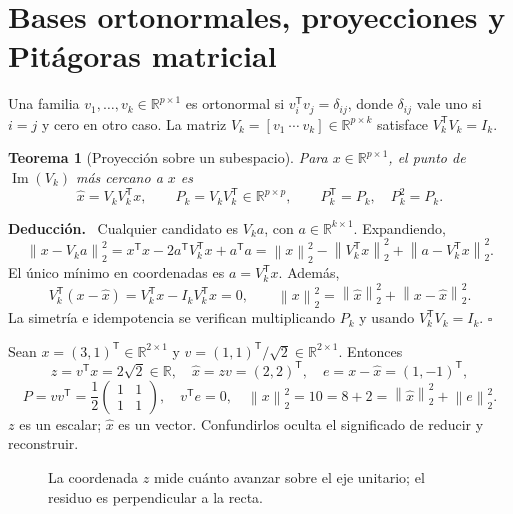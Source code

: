 \documentclass[11pt,a4paper]{article}
\newcommand{\R}{\mathbb R}
\newcommand{\T}{^{\mathsf T}}
\newcommand{\norm}[1]{\left\lVert #1\right\rVert}
\DeclareMathOperator{\spanop}{span}
\newenvironment{deduccion}{\par\textbf{Deducción.}\ }{\hfill$\square$\par}
\DeclareMathOperator{\range}{Im}
\newtheorem{teorema}{Teorema}[section]
\theoremstyle{definition}
\begin{document}
\section{Bases ortonormales, proyecciones y Pitágoras matricial}
Una familia $v_1,\ldots,v_k\in\R^{p\times1}$ es ortonormal si $v_i\T v_j=\delta_{ij}$, donde $\delta_{ij}$ vale uno si $i=j$ y cero en otro caso. La matriz $V_k=[v_1\ \cdots\ v_k]\in\R^{p\times k}$ satisface $V_k\T V_k=I_k$.
\begin{teorema}[Proyección sobre un subespacio]
Para $x\in\R^{p\times1}$, el punto de $\range(V_k)$ más cercano a $x$ es
\[
\widehat x=V_kV_k\T x,\qquad P_k=V_kV_k\T\in\R^{p\times p},\qquad
P_k\T=P_k,\quad P_k^2=P_k.
\]
\end{teorema}
\begin{deduccion}
Cualquier candidato es $V_k a$, con $a\in\R^{k\times1}$. Expandiendo,
\[
\norm{x-V_ka}_2^2=x\T x-2a\T V_k\T x+a\T a
=\norm{x}_2^2-\norm{V_k\T x}_2^2+\norm{a-V_k\T x}_2^2.
\]
El único mínimo en coordenadas es $a=V_k\T x$. Además,
\[
V_k\T(x-\widehat x)=V_k\T x-I_kV_k\T x=0,\qquad
\norm x_2^2=\norm{\widehat x}_2^2+\norm{x-\widehat x}_2^2.
\]
La simetría e idempotencia se verifican multiplicando $P_k$ y usando $V_k\T V_k=I_k$.
\end{deduccion}
\begin{ejemplo}
Sean $x=(3,1)\T\in\R^{2\times1}$ y $v=(1,1)\T/\sqrt2\in\R^{2\times1}$. Entonces
\[
z=v\T x=2\sqrt2\in\R,\quad \widehat x=zv=(2,2)\T,\quad e=x-\widehat x=(1,-1)\T,
\]
\[
P=vv\T=\frac12\begin{pmatrix}1&1\\1&1\end{pmatrix},\quad
v\T e=0,\quad \norm x_2^2=10=8+2=\norm{\widehat x}_2^2+\norm e_2^2.
\]
$z$ es un escalar; $\widehat x$ es un vector. Confundirlos oculta el significado de reducir y reconstruir.
\end{ejemplo}
\begin{figure}[H]\centering
{}
\caption{La coordenada $z$ mide cuánto avanzar sobre el eje unitario; el residuo es perpendicular a la recta.}
\end{figure}
\end{document}
